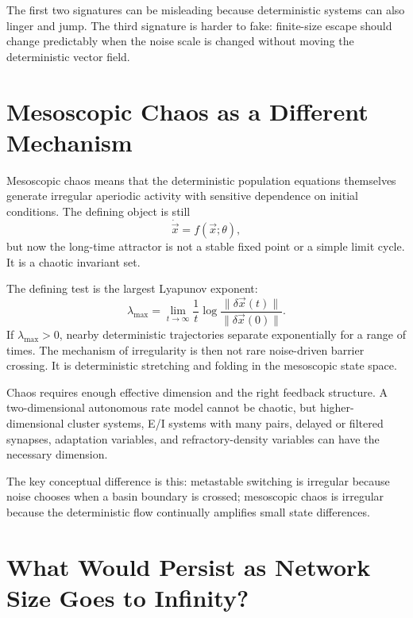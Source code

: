 The first two signatures can be misleading because deterministic systems can also linger and jump. The third signature is harder to fake: finite-size escape should change predictably when the noise scale is changed without moving the deterministic vector field.

\section{Mesoscopic Chaos as a Different Mechanism}
\label{sec:mesoscopic-chaos-different-mechanism}

Mesoscopic chaos means that the deterministic population equations themselves generate irregular aperiodic activity with sensitive dependence on initial conditions. The defining object is still
%
\begin{equation}
  \dot{\vec x}=f(\vec x;\theta),
  \label{eq:chaos-deterministic-system}
\end{equation}
%
but now the long-time attractor is not a stable fixed point or a simple limit cycle. It is a chaotic invariant set.

The defining test is the largest Lyapunov exponent:
%
\begin{equation}
  \lambda_{\max}
  =
  \lim_{t\to\infty}
  \frac{1}{t}
  \log
  \frac{\|\delta\vec x(t)\|}{\|\delta\vec x(0)\|}.
  \label{eq:largest-lyapunov-definition}
\end{equation}
%
If $\lambda_{\max}>0$, nearby deterministic trajectories separate exponentially for a range of times. The mechanism of irregularity is then not rare noise-driven barrier crossing. It is deterministic stretching and folding in the mesoscopic state space.

Chaos requires enough effective dimension and the right feedback structure. A two-dimensional autonomous rate model cannot be chaotic, but higher-dimensional cluster systems, E/I systems with many pairs, delayed or filtered synapses, adaptation variables, and refractory-density variables can have the necessary dimension.

The key conceptual difference is this: metastable switching is irregular because noise chooses when a basin boundary is crossed; mesoscopic chaos is irregular because the deterministic flow continually amplifies small state differences.

\section{What Would Persist as Network Size Goes to Infinity?}
\label{sec:what-persists-network-size-infinity}

